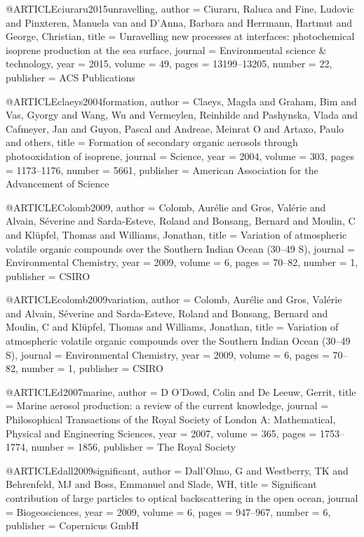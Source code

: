 @ARTICLE{ciuraru2015unravelling,
  author = {Ciuraru, Raluca and Fine, Ludovic and Pinxteren, Manuela van and
	D’Anna, Barbara and Herrmann, Hartmut and George, Christian},
  title = {Unravelling new processes at interfaces: photochemical isoprene production
	at the sea surface},
  journal = {Environmental science \& technology},
  year = {2015},
  volume = {49},
  pages = {13199--13205},
  number = {22},
  publisher = {ACS Publications}
}

@ARTICLE{claeys2004formation,
  author = {Claeys, Magda and Graham, Bim and Vas, Gyorgy and Wang, Wu and Vermeylen,
	Reinhilde and Pashynska, Vlada and Cafmeyer, Jan and Guyon, Pascal
	and Andreae, Meinrat O and Artaxo, Paulo and others},
  title = {Formation of secondary organic aerosols through photooxidation of
	isoprene},
  journal = {Science},
  year = {2004},
  volume = {303},
  pages = {1173--1176},
  number = {5661},
  publisher = {American Association for the Advancement of Science}
}

@ARTICLE{Colomb2009,
  author = {Colomb, Aur{\'e}lie and Gros, Val{\'e}rie and Alvain, S{\'e}verine
	and Sarda-Esteve, Roland and Bonsang, Bernard and Moulin, C and Kl{\"u}pfel,
	Thomas and Williams, Jonathan},
  title = {Variation of atmospheric volatile organic compounds over the Southern
	Indian Ocean (30--49 S)},
  journal = {Environmental Chemistry},
  year = {2009},
  volume = {6},
  pages = {70--82},
  number = {1},
  publisher = {CSIRO}
}

@ARTICLE{colomb2009variation,
  author = {Colomb, Aur{\'e}lie and Gros, Val{\'e}rie and Alvain, S{\'e}verine
	and Sarda-Esteve, Roland and Bonsang, Bernard and Moulin, C and Kl{\"u}pfel,
	Thomas and Williams, Jonathan},
  title = {Variation of atmospheric volatile organic compounds over the Southern
	Indian Ocean (30--49 S)},
  journal = {Environmental Chemistry},
  year = {2009},
  volume = {6},
  pages = {70--82},
  number = {1},
  publisher = {CSIRO}
}

@ARTICLE{d2007marine,
  author = {D O'Dowd, Colin and De Leeuw, Gerrit},
  title = {Marine aerosol production: a review of the current knowledge},
  journal = {Philosophical Transactions of the Royal Society of London A: Mathematical,
	Physical and Engineering Sciences},
  year = {2007},
  volume = {365},
  pages = {1753--1774},
  number = {1856},
  publisher = {The Royal Society}
}

@ARTICLE{dall2009significant,
  author = {Dall'Olmo, G and Westberry, TK and Behrenfeld, MJ and Boss, Emmanuel
	and Slade, WH},
  title = {Significant contribution of large particles to optical backscattering
	in the open ocean},
  journal = {Biogeosciences},
  year = {2009},
  volume = {6},
  pages = {947--967},
  number = {6},
  publisher = {Copernicus GmbH}
}


